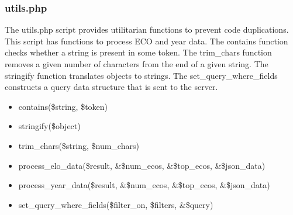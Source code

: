 \documentclass{article}
\begin{document}
\subsubsection{utils.php}
The utils.php script provides utilitarian functions to prevent code
duplications. This script has functions to process ECO and year data. The
contains function checks whether a string is present in some token. The
trim\_chars function removes a given number of characters from the end of a
given string. The stringify function translates objects to strings. The
set\_query\_where\_fields constructs a query data structure that is sent to the
server.
\begin{itemize}
	\item contains(\$string, \$token)
	\item stringify(\$object)
	\item trim\_chars(\$string, \$num\_chars)
	\item process\_elo\_data(\$result, \&\$num\_ecos, \&\$top\_ecos,
		\&\$json\_data)
	\item process\_year\_data(\$result, \&\$num\_ecos, \&\$top\_ecos,
		\&\$json\_data)
	\item set\_query\_where\_fields(\$filter\_on, \$filters, \&\$query)
\end{itemize}
\end{document}

